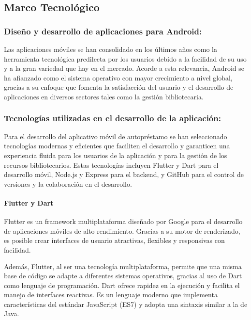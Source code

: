 \documentclass[spanish]{ieee_upb}
\begin{document}
\subsection{Marco Tecnológico}
\subsubsection{Diseño y desarrollo de aplicaciones para Android: }
Las aplicaciones móviles se han consolidado en los últimos años como la herramienta tecnológica predilecta por los usuarios debido a la facilidad de su uso y a la gran variedad que hay en el mercado. Acorde a esta relevancia, Android se ha afianzado como el sistema operativo con mayor crecimiento a nivel global, gracias a su enfoque que fomenta la satisfacción del usuario y el desarrollo de aplicaciones en diversos sectores tales como la gestión bibliotecaria. \cite{Statista2025} \cite{polanco2011android}

\subsubsection{Tecnologías utilizadas en el desarrollo de la aplicación: }
Para el desarrollo del aplicativo móvil de autopréstamo se han seleccionado tecnologías modernas y eficientes que faciliten el desarrollo y garanticen una experiencia fluida para los usuarios de la aplicación y para la gestión de los recursos bibliotecarios. Estas tecnologías incluyen Flutter y Dart para el desarrollo móvil, Node.js y Express para el backend, y GitHub para el control de versiones y la colaboración en el desarrollo.
\vspace{0.3 cm}

\paragraph{\textbf{Flutter y Dart}}
Flutter es un framework multiplataforma diseñado por Google para el desarrollo de aplicaciones móviles de alto rendimiento. Gracias a su motor de renderizado, es posible crear interfaces de usuario atractivas, flexibles y responsivas con facilidad. \cite{tashildar2020application} \cite{Kinari2024}
\vspace{0.3 cm}

Además, Flutter, al ser una tecnología multiplataforma, permite que una misma base de código se adapte a diferentes sistemas operativos, gracias al uso de Dart como lenguaje de programación. Dart ofrece rapidez en la ejecución y facilita el manejo de interfaces reactivas. Es un lenguaje moderno que implementa características del estándar JavaScript (ES7) y adopta una sintaxis similar a la de Java.\cite{tashildar2020application}
\vspace{0.3 cm}
\end{document}
